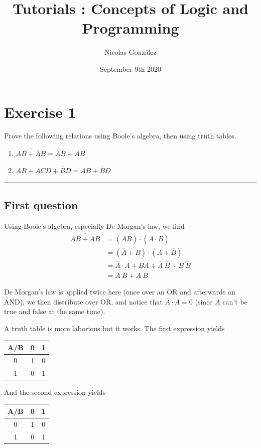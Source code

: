 \documentclass[a4paper,10pt]{article}
\title{Tutorials : Concepts of Logic and Programming}
\author{Nicolas González}
\date{September 9th 2020}
\def\centralruler{\begin{center}\rule{5cm}{.1pt}\end{center}}
\begin{document}
\maketitle

\newpage

\section{Exercise 1}
Prove the following relations using Boole's algebra, then using truth tables.
\begin{enumerate}
	\item $\overline{A\overline{B}+\overline{A}B}=\overline{A}{\overline{B}}+AB$
	\item $AB+ACD+\overline{B}D=AB+\overline{B}D$
\end{enumerate}

\centralruler

\subsection{First question}

Using Boole's algebra, especially De Morgan's law, we find
\begin{align*}
	\overline{A\overline{B}+\overline{A}B}&=
\overline{(A\overline{B})}\cdot\overline{(\overline{A}\cdot B)}\\
&=\left(\overline{A}+B\right)\cdot\left(A+\overline{B}\right)\\
&=\overline{A}\cdot A+BA+\overline{A}~\overline{B}+B~\overline{B}\\
&=\overline{A}~\overline{B}+A~B
\end{align*}

De Morgan's law is applied twice here (once over an OR and afterwards an AND), we then distribute over OR, and notice that $\overline{A}\cdot A=0$ (since $A$ can't be true and false at the same time).

A truth table is more laborious but it works. The first expression yields
\begin{center}
	\begin{tabular}{|c|c|c|}
		\hline
		A/B&0&1\\\hline
		0&1&0\\\hline
		1&0&1\\\hline
	\end{tabular}
\end{center}

And the second expression yields
\begin{center}
	\begin{tabular}{|c|c|c|}
		\hline
		A/B&0&1\\\hline
		0&1&0\\\hline
		1&0&1\\\hline
	\end{tabular}
\end{center}
\end{document}
